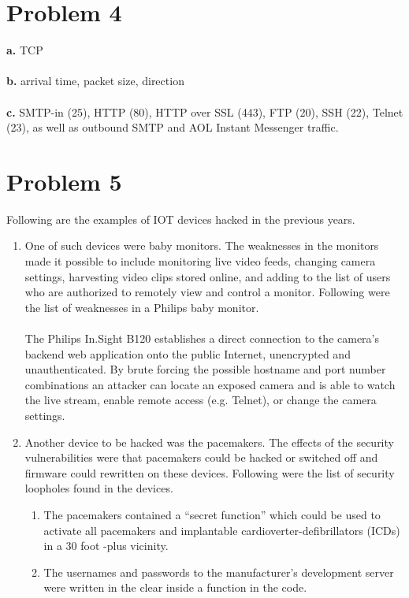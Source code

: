 \documentclass[10pt]{article}
\begin{document}
\begin{itemize}
\section{Problem 4}
\textbf{a.} TCP\\\\
\textbf{b.} arrival time, packet size, direction\\\\
\textbf{c.} 
 SMTP-in (25), HTTP (80), HTTP over SSL (443), FTP (20), SSH (22), Telnet (23), as well as outbound SMTP and AOL Instant Messenger traffic.
\section{Problem 5}
Following are the examples of IOT devices hacked in the previous years. 
\begin{enumerate}
\item One of such devices were baby monitors. The weaknesses in the monitors made it possible to include monitoring live video feeds, changing camera settings, harvesting video clips stored online, and adding to the list of users who are authorized to remotely view and control a monitor. Following were the list of weaknesses in a Philips baby monitor.\\\\
The Philips In.Sight B120 establishes a direct connection to the camera's backend web application onto the public Internet, unencrypted and unauthenticated. By brute forcing the possible hostname and port number combinations an attacker can locate an exposed camera and is able to watch the live stream, enable remote access (e.g. Telnet), or change the camera settings.\\
\item Another device to be hacked was the pacemakers. The effects of the security vulnerabilities were that pacemakers could be hacked or switched off and firmware could rewritten on these devices. Following were the list of security loopholes found in the devices.
\begin{enumerate}
\item The pacemakers contained a “secret function” which could be used to activate all pacemakers and implantable cardioverter-defibrillators (ICDs) in a 30 foot -plus vicinity.
\item  The usernames and passwords to the manufacturer’s development server were written in the clear inside a function in the code.
\end{enumerate}
\end{enumerate}
\end{itemize}
\end{document}
